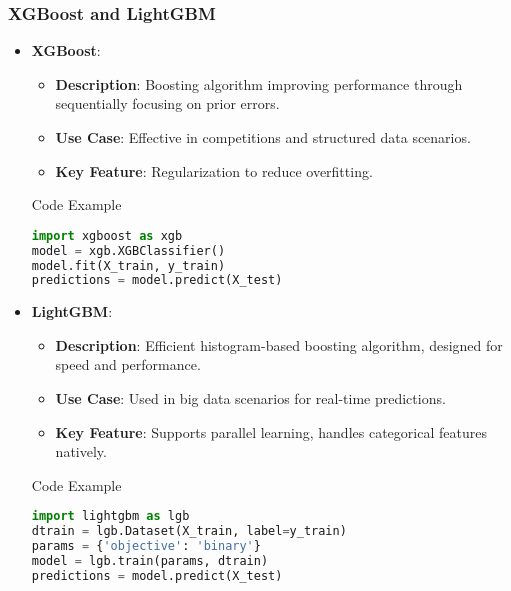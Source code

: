 \documentclass[aspectratio=169]{beamer}
\begin{document}
\begin{frame}[fragile]
    \frametitle{XGBoost and LightGBM}
    \begin{itemize}
        \item \textbf{XGBoost}:
        \begin{itemize}
            \item \textbf{Description}: Boosting algorithm improving performance through sequentially focusing on prior errors.
            \item \textbf{Use Case}: Effective in competitions and structured data scenarios.
            \item \textbf{Key Feature}: Regularization to reduce overfitting.
        \end{itemize}
        \begin{block}{Code Example}
            \begin{lstlisting}[language=Python]
import xgboost as xgb
model = xgb.XGBClassifier()
model.fit(X_train, y_train)
predictions = model.predict(X_test)
            \end{lstlisting}
        \end{block}
        
        \item \textbf{LightGBM}:
        \begin{itemize}
            \item \textbf{Description}: Efficient histogram-based boosting algorithm, designed for speed and performance.
            \item \textbf{Use Case}: Used in big data scenarios for real-time predictions.
            \item \textbf{Key Feature}: Supports parallel learning, handles categorical features natively.
        \end{itemize}
        \begin{block}{Code Example}
            \begin{lstlisting}[language=Python]
import lightgbm as lgb
dtrain = lgb.Dataset(X_train, label=y_train)
params = {'objective': 'binary'}
model = lgb.train(params, dtrain)
predictions = model.predict(X_test)
            \end{lstlisting}
        \end{block}
    \end{itemize}
\end{frame}
\end{document}
